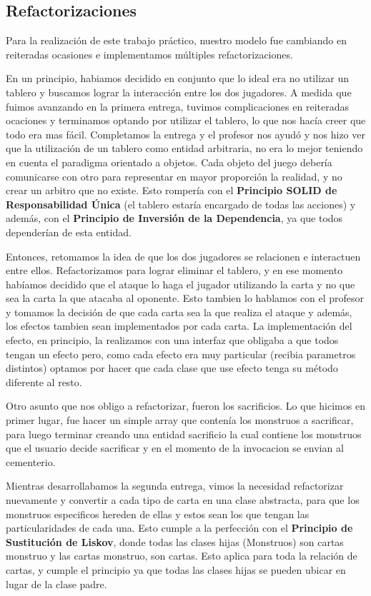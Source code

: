 \subsection{Refactorizaciones}

Para la realización de este trabajo práctico, nuestro modelo fue cambiando en reiteradas ocasiones e implementamos múltiples refactorizaciones. 

En un principio, habiamos decidido en conjunto que lo ideal era no utilizar un tablero y buscamos lograr la interacción entre los dos jugadores. A medida que fuimos avanzando en la primera entrega, tuvimos complicaciones en reiteradas ocaciones y terminamos optando por utilizar el tablero, lo que nos hacía creer que todo era mas fácil. Completamos la entrega y el profesor nos ayudó y nos hizo ver que la utilización de un tablero como entidad arbitraria, no era lo mejor teniendo en cuenta el paradigma orientado a objetos. Cada objeto del juego debería comunicarse con otro para representar en mayor proporción la realidad, y no crear un arbitro que no existe. Esto rompería con el \textbf{Principio SOLID de Responsabilidad Única} (el tablero estaría encargado de todas las acciones) y además, con el \textbf{Principio de Inversión de la Dependencia}, ya que todos dependerían de esta entidad.


Entonces, retomamos la idea de que los dos jugadores se relacionen e interactuen entre ellos. Refactorizamos para lograr eliminar el tablero, y en ese momento habíamos decidido que el ataque lo haga el jugador utilizando la carta y no que sea la carta la que atacaba al oponente. Esto tambien lo hablamos con el profesor y tomamos la decisión de que cada carta sea la que realiza el ataque y además, los efectos tambien sean implementados por cada carta. La implementación del efecto, en principio, la realizamos con una interfaz que obligaba a que todos tengan un efecto pero, como cada efecto era muy particular (recibia parametros distintos) optamos por hacer que cada clase que use efecto tenga su método diferente al resto.


Otro asunto que nos obligo a refactorizar, fueron los sacrificios. Lo que hicimos en primer lugar, fue hacer un simple array que contenía los monstruos a sacrificar, para luego terminar creando una entidad sacrificio la cual contiene los monstruos que el usuario decide sacrificar y en el momento de la invocacion se envian al cementerio.


Mientras desarrollabamos la segunda entrega, vimos la necesidad refactorizar nuevamente y convertir a cada tipo de carta en una clase abstracta, para que los monstruos especificos hereden de ellas y estos sean los que tengan las particularidades de cada una. Esto cumple a la perfección con el \textbf{Principio de Sustitución de Liskov}, donde todas las clases hijas (Monstruos) son cartas monstruo y las cartas monstruo, son cartas. Esto aplica para toda la relación de cartas, y cumple el principio ya que todas las clases hijas se pueden ubicar en lugar de la clase padre. 


